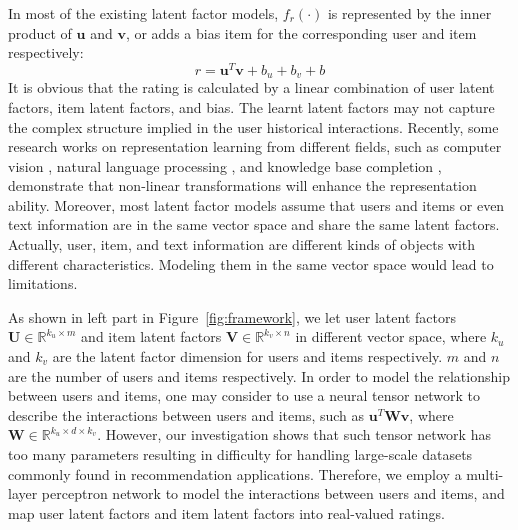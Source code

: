 \documentclass[sigconf]{acmart}
\begin{document}
In most of the existing latent factor models, $f_r(\cdot)$ is represented by the inner product of $\mathbf{u}$ and $\mathbf{v}$, or adds a bias item for the corresponding user and item respectively:
\begin{equation}
\hat r = \mathbf{u}^T\mathbf{v} + b_u + b_v + b
\end{equation}
It is obvious that the rating is calculated by a linear combination of user latent factors, item latent factors, and bias.
The learnt latent factors may not capture the complex structure implied in the user historical interactions.
Recently, some research works on representation learning from different fields,  such as computer vision \cite{krizhevsky2012imagenet,goodfellow2014generative}, natural language processing \cite{mikolov2013distributed,le2014distributed}, and knowledge base completion \cite{socher2013reasoning},  demonstrate that non-linear transformations will enhance the representation ability.
Moreover, most latent factor models assume that users and items or even text information are in the same vector space and share the same latent factors.
Actually, user, item, and text information are different kinds of objects with different characteristics.
Modeling them in the same vector space would lead to limitations.

\begin{comment}
\begin{figure}[!t]
\centering
\texttt{[image: vec.pdf]}
\caption{\label{fig:vec}
Uses and items are projected from their own latent vector space to a new shared space. Interactions between users and items are operated in the shared space.
}
\vspace{-3mm}
\end{figure}
\end{comment}

As shown in left part in Figure~\ref{fig:framework}, we let user latent factors  $\mathbf{U} \in \mathbb{R}^{k_u \times m}$ and item latent factors $\mathbf{V} \in \mathbb{R}^{k_v \times n}$ in different vector space, where $k_u$ and $k_v$ are the latent factor dimension for users and items respectively.
$m$ and $n$ are the number of users and items respectively.
In order to model the relationship between users and items, one may consider to use a neural tensor network \cite{socher2013reasoning} to describe the interactions between users and items, such as $\mathbf{u}^T\mathbf{W}\mathbf{v}$, where $\mathbf{W} \in \mathbb{R}^{k_u \times d \times k_v}$.
However, our investigation shows that such tensor network has too many parameters resulting in difficulty for handling large-scale datasets commonly found in recommendation applications.
Therefore, we employ a multi-layer perceptron network to model the interactions between users and items, and map user latent factors and item latent factors into real-valued ratings.
\end{document}
